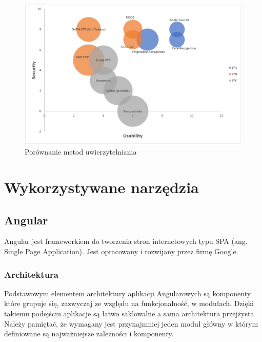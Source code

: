 \begin{figure}[ht]
	\centering
		\includegraphics[width=1\linewidth]{imgs/wyk1.png}
	\caption{Porównanie metod uwierzytelniania}
	\label{fig:metody-uwierzytelniania-porownanie}
\end{figure}

\section{Wykorzystywane narzędzia}
\subsection{Angular}

Angular jest frameworkiem do tworzenia stron internetowych typu SPA (ang. Single Page Application). Jest opracowany i rozwijany przez firmę Google. 
\subsubsection{Architektura}
Podstawowym elementem architektury aplikacji Angularowych są komponenty które grupuje się, zazwyczaj ze względu na funkcjonalność, w modułach. Dzięki takiemu podejściu aplikacje są łatwo saklowalne a sama architektura przejżysta. Należy pamiętać, że wymagany jest przynajmniej jeden moduł główny w którym definiowane są najważniejsze zależności i komponenty.

